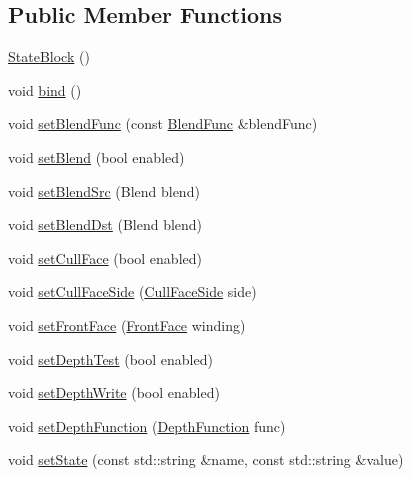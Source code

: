 \subsection*{Public Member Functions}
\begin{DoxyCompactItemize}
\item 
\hyperlink{classRenderState_1_1StateBlock_ad40095d868f989d391b039c4a470b87d}{State\+Block} ()
\item 
void \hyperlink{classRenderState_1_1StateBlock_a045055d7b3f19710d52f2a00900fec50}{bind} ()
\item 
void \hyperlink{classRenderState_1_1StateBlock_a68e05f7ba5e689c06d584bf714cecb61}{set\+Blend\+Func} (const \hyperlink{structBlendFunc}{Blend\+Func} \&blend\+Func)
\item 
void \hyperlink{classRenderState_1_1StateBlock_a39bd0858d8bb963f844805f32693b681}{set\+Blend} (bool enabled)
\item 
void \hyperlink{classRenderState_1_1StateBlock_a1863a0ca059594f9c14e7311123951fe}{set\+Blend\+Src} (Blend blend)
\item 
void \hyperlink{classRenderState_1_1StateBlock_a20465bd4399b6559ae274f9556abec97}{set\+Blend\+Dst} (Blend blend)
\item 
void \hyperlink{classRenderState_1_1StateBlock_aee954a3ca23df9c4fbe91aed0d62c216}{set\+Cull\+Face} (bool enabled)
\item 
void \hyperlink{classRenderState_1_1StateBlock_af8d4f7b418f321ed9a275ded0cbe5ec4}{set\+Cull\+Face\+Side} (\hyperlink{classRenderState_a9b99d2625b13af77f1f8fa8101e3ad85}{Cull\+Face\+Side} side)
\item 
void \hyperlink{classRenderState_1_1StateBlock_aeb2cec31e5c14cfc37205b5a2d798ec8}{set\+Front\+Face} (\hyperlink{classRenderState_ac748310042b020a92ea97ede898be30e}{Front\+Face} winding)
\item 
void \hyperlink{classRenderState_1_1StateBlock_a3429ac03013bdc1826b578f772d88992}{set\+Depth\+Test} (bool enabled)
\item 
void \hyperlink{classRenderState_1_1StateBlock_a49ef11a9c1f4d967e184fbfa3c39f4bc}{set\+Depth\+Write} (bool enabled)
\item 
void \hyperlink{classRenderState_1_1StateBlock_ae38edb63f630b68248db0d33c649c34f}{set\+Depth\+Function} (\hyperlink{classRenderState_a36d3d228500feb75244c2c761c42b231}{Depth\+Function} func)
\item 
void \hyperlink{classRenderState_1_1StateBlock_a2c2c0261c33ec94e36ec97d879179118}{set\+State} (const std\+::string \&name, const std\+::string \&value)

\end{DoxyCompactItemize}
